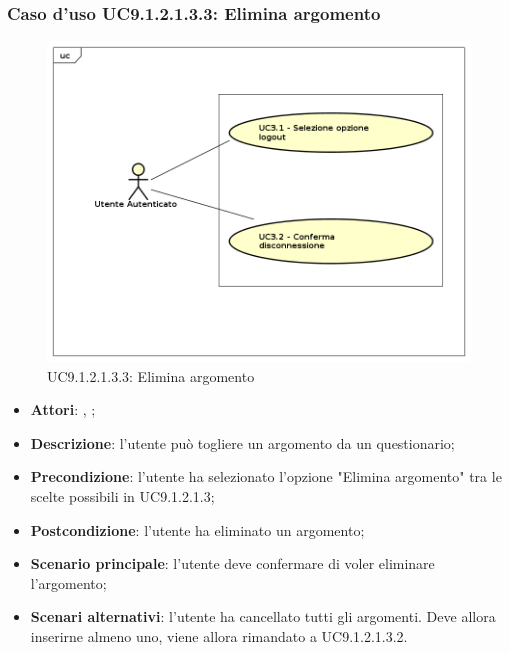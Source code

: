 						\subsubsection{Caso d'uso UC9.1.2.1.3.3: Elimina argomento}
						\label{UC9.1.2.1.3.3}
						\begin{figure}[h]
							\centering
							\includegraphics[scale=0.7,keepaspectratio]{UML/UC9.png}
							\caption{UC9.1.2.1.3.3: Elimina argomento}
						\end{figure}
						\FloatBarrier
						\begin{itemize}
							\item \textbf{Attori}: \uau, \uaupro;
							\item \textbf{Descrizione}: l'utente può togliere un argomento da un questionario;
							\item \textbf{Precondizione}: l'utente ha selezionato l'opzione "Elimina argomento" tra le scelte possibili in UC9.1.2.1.3;
							\item \textbf{Postcondizione}: l'utente ha eliminato un argomento;
							\item \textbf{Scenario principale}: l'utente deve confermare di voler eliminare l'argomento; 
							\item \textbf{Scenari alternativi}: l'utente ha cancellato tutti gli argomenti. Deve allora inserirne almeno uno, viene allora rimandato a UC9.1.2.1.3.2.

						\end{itemize}
						
